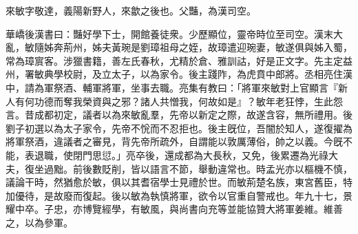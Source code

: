 
\begin{pinyinscope}
來敏字敬達，義陽新野人，來歙之後也。父豔，為漢司空。

華嶠後漢書曰：豔好學下士，開館養徒衆。少歷顯位，靈帝時位至司空。漢末大亂，敏隨姊奔荊州，姊夫黃琬是劉璋祖母之姪，故璋遣迎琬妻，敏遂俱與姊入蜀，常為璋賔客。涉獵書籍，善左氏春秋，尤精於倉、雅訓詁，好是正文字。先主定益州，署敏典學校尉，及立太子，以為家令。後主踐阼，為虎賁中郎將。丞相亮住漢中，請為軍祭酒、輔軍將軍，坐事去職。亮集有教曰：「將軍來敏對上官顯言『新人有何功德而奪我榮資與之邪？諸人共憎我，何故如是』？敏年老狂悖，生此怨言。昔成都初定，議者以為來敏亂羣，先帝以新定之際，故遂含容，無所禮用。後劉子初選以為太子家令，先帝不恱而不忍拒也。後主旣位，吾闇於知人，遂復擢為將軍祭酒，違議者之審見，背先帝所疏外，自謂能以敦厲薄俗，帥之以義。今旣不能，表退職，使閉門思愆。」亮卒後，還成都為大長秋，又免，後累遷為光祿大夫，復坐過黜。前後數貶削，皆以語言不節，舉動違常也。時孟光亦以樞機不慎，議論干時，然猶愈於敏，俱以其耆宿學士見禮於世。而敏荊楚名族，東宮舊臣，特加優待，是故廢而復起。後以敏為執慎將軍，欲令以官重自警戒也。年九十七，景耀中卒。子忠，亦博覽經學，有敏風，與尚書向充等並能協贊大將軍姜維。維善之，以為參軍。


\end{pinyinscope}